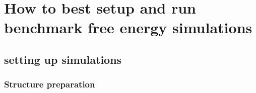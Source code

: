 \documentclass[9pt,bestpractices]{livecoms}
\begin{document}


\section{How to best setup and run benchmark free energy simulations}

\subsection{setting up simulations}
\label{sec:setup}


\subsubsection{Structure preparation}
\label{sec:prep}
\end{document}
